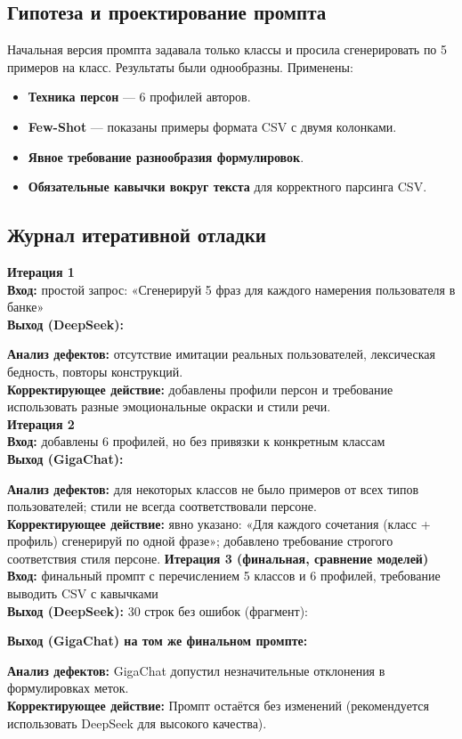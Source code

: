 \documentclass[oneside,a4paper,14pt]{extarticle} %
\begin{document}
\subsection{Гипотеза и проектирование промпта}
\noindent
Начальная версия промпта задавала только классы и просила сгенерировать по 5 примеров на класс. Результаты были однообразны. Применены:
\begin{itemize}
\item \textbf{Техника персон} --- 6 профилей авторов.
\item \textbf{Few-Shot} --- показаны примеры формата CSV с двумя колонками.
\item \textbf{Явное требование разнообразия формулировок}.
\item \textbf{Обязательные кавычки вокруг текста} для корректного парсинга CSV.
\end{itemize}
\newpage
\subsection{Журнал итеративной отладки}
\noindent
\textbf{Итерация 1} \\
\noindent
\textbf{Вход:} простой запрос: «Сгенерируй 5 фраз для каждого намерения пользователя в банке» \\
\noindent
\textbf{Выход (DeepSeek):} 

\noindent
\textbf{Анализ дефектов:} отсутствие имитации реальных пользователей, лексическая бедность, повторы конструкций. \\
\noindent
\textbf{Корректирующее действие:} добавлены профили персон и требование использовать разные эмоциональные окраски и стили речи. \\
\newline
\noindent
\textbf{Итерация 2} \\
\noindent
\textbf{Вход:} добавлены 6 профилей, но без привязки к конкретным классам \\
\noindent
\textbf{Выход (GigaChat):}

\noindent
\textbf{Анализ дефектов:} для некоторых классов не было примеров от всех типов пользователей; стили не всегда соответствовали персоне. \\
\noindent
\textbf{Корректирующее действие:} явно указано: «Для каждого сочетания (класс + профиль) сгенерируй по одной фразе»; добавлено требование строгого соответствия стиля персоне.
\newpage
\noindent
\textbf{Итерация 3 (финальная, сравнение моделей)} \\
\noindent
\textbf{Вход:} финальный промпт с перечислением 5 классов и 6 профилей, требование выводить CSV с кавычками \\
\noindent
\textbf{Выход (DeepSeek):} 30 строк без ошибок (фрагмент):

\noindent
\textbf{Выход (GigaChat) на том же финальном промпте:}

\noindent
\textbf{Анализ дефектов:} GigaChat допустил незначительные отклонения в формулировках меток. \\
\noindent
\textbf{Корректирующее действие:} Промпт остаётся без изменений (рекомендуется использовать DeepSeek для высокого качества).
\newpage
\end{document}
